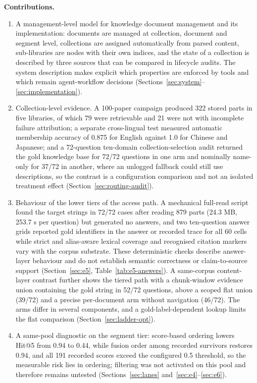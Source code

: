 \noindent\textbf{Contributions.}
\begin{enumerate}
\item A management-level model for knowledge document management and its
implementation: documents are managed at collection, document and segment
level, collections are assigned automatically from parsed content,
sub-libraries are nodes with their own indices, and the state of a
collection is described by three sources that can be compared in lifecycle
audits. The system description makes explicit which properties
are enforced by tools and which remain agent-workflow decisions
(Sections~\ref{sec:system}--\ref{sec:implementation}).
\item Collection-level evidence. A 100-paper campaign produced 322 stored parts
in five libraries, of which 79 were retrievable and 21 were not with
incomplete failure attribution; a separate cross-lingual test measured
automatic membership accuracy of 0.875 for English against 1.0 for Chinese and
Japanese; and a 72-question ten-domain collection-selection audit returned the
gold knowledge base for 72/72 questions in one arm and nominally name-only for
37/72 in another, where an unlogged fallback could still use descriptions, so
the contrast is a configuration comparison and not an isolated treatment effect
(Section~\ref{sec:routing-audit}).
\item Behaviour of the lower tiers of the access path. A mechanical full-read
script found the target strings in 72/72 cases after reading 879 parts
(24.3 MB, 253.7 s per question) but generated no answers, and two ten-question
answer grids reported gold identifiers in the answer or recorded trace for all 60 cells while strict and
alias-aware lexical coverage and recognised citation markers vary with the
corpus substrate. These deterministic checks describe answer-layer behaviour
and do not establish semantic correctness or claim-to-source support
(Section~\ref{sec:e5}, Table~\ref{tab:e5-answers}). A same-corpus content-layer
contrast further shows the tiered path with a chunk-window evidence union
containing the gold string in 52/72 questions, above a scoped flat union
(39/72) and a precise per-document arm without navigation (46/72). The arms
differ in several components, and a gold-label-dependent lookup limits the
flat comparison
(Section~\ref{sec:ladder-opt}).
\item A same-pool diagnostic on the segment tier: score-based ordering lowers
Hit@5 from 0.94 to 0.44, while fusion order among recorded survivors restores
0.94, and all 191 recorded scores exceed the configured 0.5 threshold, so the
measurable risk lies in ordering; filtering was not activated on this pool
and therefore remains untested
(Sections~\ref{sec:lanes} and~\ref{sec:e4}--\ref{sec:e6}).
\end{enumerate}

